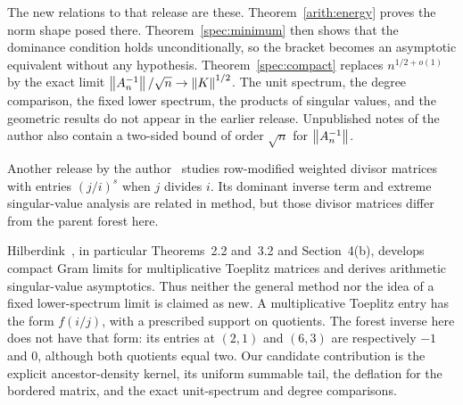 The new relations to that release are these. Theorem~\ref{arith:energy} proves the norm shape posed there. Theorem~\ref{spec:minimum} then shows that the dominance condition holds unconditionally, so the bracket becomes an asymptotic equivalent without any hypothesis. Theorem~\ref{spec:compact} replaces $n^{1/2+o(1)}$ by the exact limit $\left\lVert A_n^{-1}\right\rVert/\sqrt n\to\left\lVert K\right\rVert^{1/2}$. The unit spectrum, the degree comparison, the fixed lower spectrum, the products of singular values, and the geometric results do not appear in the earlier release. Unpublished notes of the author also contain a two-sided bound of order $\sqrt n$ for $\left\lVert A_n^{-1}\right\rVert$.

Another release by the author~\cite{klineExtremal} studies row-modified weighted divisor matrices with entries $(j/i)^s$ when $j$ divides $i$. Its dominant inverse term and extreme singular-value analysis are related in method, but those divisor matrices differ from the parent forest here.

Hilberdink~\cite{hilberdink}, in particular Theorems~2.2 and~3.2 and Section~4(b), develops compact Gram limits for multiplicative Toeplitz matrices and derives arithmetic singular-value asymptotics. Thus neither the general method nor the idea of a fixed lower-spectrum limit is claimed as new. A multiplicative Toeplitz entry has the form $f(i/j)$, with a prescribed support on quotients. The forest inverse here does not have that form: its entries at $(2,1)$ and $(6,3)$ are respectively $-1$ and $0$, although both quotients equal two. Our candidate contribution is the explicit ancestor-density kernel, its uniform summable tail, the deflation for the bordered matrix, and the exact unit-spectrum and degree comparisons.


